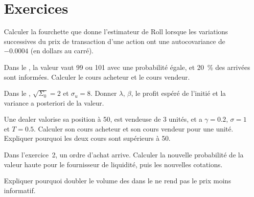 \section{Exercices}

\begin{exercise}[$\star$]\label{exo:mx:why-there-is-a-spread:1}
Calculer la fourchette que donne l'estimateur de Roll lorsque les variations successives du prix de transaction d'une action ont une autocovariance de $-0.0004$ (en dollars au carré).
\end{exercise}

\begin{exercise}[$\star$]\label{exo:mx:why-there-is-a-spread:2}
Dans le , la valeur vaut 99 ou 101 avec une probabilité égale, et 20~\% des arrivées sont informées. Calculer le cours acheteur et le cours vendeur.
\end{exercise}

\begin{exercise}[$\star$]\label{exo:mx:why-there-is-a-spread:3}
Dans le , $\sqrt{\Sigma_0}=2$ et $\sigma_u=8$. Donner $\lambda$, $\beta$, le profit espéré de l'initié et la variance a posteriori de la valeur.
\end{exercise}

\begin{exercise}[$\star\star$]\label{exo:mx:why-there-is-a-spread:4}
Une dealer valorise sa position à 50, est vendeuse de 3 unités, et a $\gamma=0.2$, $\sigma=1$ et $T=0.5$. Calculer son cours acheteur et son cours vendeur pour une unité. Expliquer pourquoi
les deux cours sont supérieurs à 50.
\end{exercise}

\begin{exercise}[$\star\star$]\label{exo:mx:why-there-is-a-spread:5}
Dans l'exercice~2, un ordre d'achat arrive. Calculer la nouvelle probabilité de la valeur haute pour le fournisseur de liquidité, puis les nouvelles cotations.
\end{exercise}

\begin{exercise}[$\star\star$]\label{exo:mx:why-there-is-a-spread:6}
Expliquer pourquoi doubler le volume des  dans le  ne rend pas le prix moins informatif.
\end{exercise}

